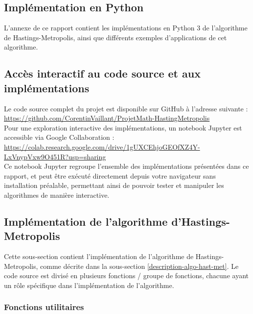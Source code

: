 \documentclass{article}
\begin{document}
\subsection{Implémentation en Python}

L'annexe de ce rapport contient les implémentations en Python 3 de l'algorithme de Hastings-Metropolis, ainsi que différents exemples d'applications de cet algorithme.

\subsection{Accès interactif au code source et aux implémentations}
Le code source complet du projet est disponible sur GitHub à l'adresse suivante : \url{https://github.com/CorentinVaillant/ProjetMath-HastingMetropolis} \\

Pour une exploration interactive des implémentations, un notebook Jupyter est accessible via Google Collaboration : \url{https://colab.research.google.com/drive/1gUXCEhjoGEOfXZ4Y-LxVnypVxw9O451R?usp=sharing} \\

Ce notebook Jupyter regroupe l'ensemble des implémentations présentées dans ce rapport, et peut être exécuté directement depuis votre navigateur sans installation préalable, permettant ainsi de pouvoir tester et manipuler les algorithmes de manière interactive.

\newpage
\subsection{Implémentation de l'algorithme d'Hastings-Metropolis}

Cette sous-section contient l'implémentation de l'algorithme de Hastings-Metropolis, comme décrite dans la sous-section \ref{description-algo-hast-met}. Le code source est divisé en plusieurs fonctions / groupe de fonctions, chacune ayant un rôle spécifique dans l'implémentation de l'algorithme.

\subsubsection{Fonctions utilitaires}
\end{document}
